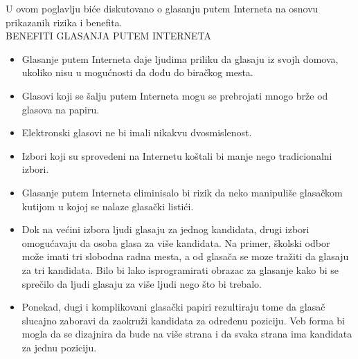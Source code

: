 \documentclass[a4paper]{article}
\theoremstyle{break}
\begin{document}
{U ovom poglavlju biće diskutovano o glasanju putem Interneta na osnovu prikazanih rizika i benefita.\\

\noindent BENEFITI GLASANJA PUTEM INTERNETA
\begin{itemize}
\item Glasanje putem Interneta daje ljudima priliku da glasaju iz svojh domova, ukoliko nisu u mogućnosti da dođu do biračkog mesta.
\item Glasovi koji se šalju putem Interneta mogu se prebrojati mnogo brže od glasova na papiru.
\item Elektronski glasovi ne bi imali nikakvu dvosmislenost.
\item Izbori koji su sprovedeni na Internetu koštali bi manje nego tradicionalni izbori.
\item Glasanje putem Interneta eliminisalo bi rizik da neko manipuliše glasačkom kutijom u kojoj se nalaze glasački listići.
\item Dok na većini izbora ljudi glasaju za jednog kandidata, drugi izbori omogućavaju da osoba glasa za više kandidata. Na primer, školski odbor može imati tri slobodna radna mesta, a od glasača se moze tražiti da glasaju za tri kandidata. Bilo bi lako isprogramirati obrazac za glasanje kako bi se sprečilo da ljudi glasaju za više ljudi nego što bi trebalo.
\item Ponekad, dugi i komplikovani glasački papiri rezultiraju tome da glasač slucajno zaboravi da zaokruži kandidata za određenu poziciju. Veb forma bi mogla da se dizajnira da bude na više strana i da svaka strana ima kandidata za jednu poziciju.
\end{itemize}


}
\end{document}
